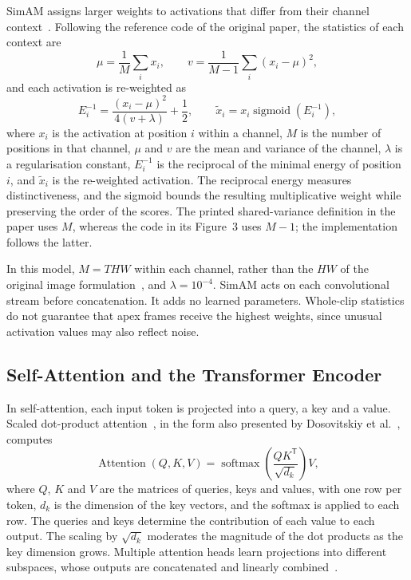 SimAM assigns larger weights to activations that differ from their channel context~\cite{yang2021}. Following the reference code of the original paper, the statistics of each context are
\begin{equation}
	\mu=\frac1M\sum_i x_i,\qquad
	v=\frac1{M-1}\sum_i(x_i-\mu)^2,
	\label{eq:simam-stats}
\end{equation}
and each activation is re-weighted as
\begin{equation}
	E_i^{-1}=\frac{(x_i-\mu)^2}{4(v+\lambda)}+\frac12,
	\qquad \widetilde x_i=x_i\operatorname{sigmoid}(E_i^{-1}),
	\label{eq:simam-gate}
\end{equation}
where $x_i$ is the activation at position $i$ within a channel, $M$ is the number of positions in that channel, $\mu$ and $v$ are the mean and variance of the channel, $\lambda$ is a regularisation constant, $E_i^{-1}$ is the reciprocal of the minimal energy of position $i$, and $\widetilde x_i$ is the re-weighted activation. The reciprocal energy measures distinctiveness, and the sigmoid bounds the resulting multiplicative weight while preserving the order of the scores. The printed shared-variance definition in the paper uses $M$, whereas the code in its Figure~3 uses $M-1$; the implementation follows the latter.

In this model, $M=THW$ within each channel, rather than the $HW$ of the original image formulation~\cite{yang2021}, and $\lambda=10^{-4}$. SimAM acts on each convolutional stream before concatenation. It adds no learned parameters. Whole-clip statistics do not guarantee that apex frames receive the highest weights, since unusual activation values may also reflect noise.

\subsection{Self-Attention and the Transformer Encoder}
\label{sec:self-attention}

In self-attention, each input token is projected into a query, a key and a value. Scaled dot-product attention~\cite{vaswani2017}, in the form also presented by Dosovitskiy et al.~\cite{dosovitskiy2021}, computes
\begin{equation}
	\operatorname{Attention}(Q,K,V)
	=\operatorname{softmax}\left(\frac{QK^{\mathsf T}}{\sqrt{d_k}}\right)V,
	\label{eq:attention}
\end{equation}
where $Q$, $K$ and $V$ are the matrices of queries, keys and values, with one row per token, $d_k$ is the dimension of the key vectors, and the softmax is applied to each row. The queries and keys determine the contribution of each value to each output. The scaling by $\sqrt{d_k}$ moderates the magnitude of the dot products as the key dimension grows. Multiple attention heads learn projections into different subspaces, whose outputs are concatenated and linearly combined~\cite{vaswani2017}.

